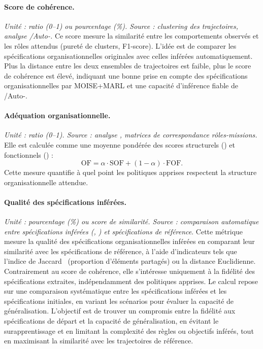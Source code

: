 \paragraph{Score de cohérence.}
\textit{Unité : ratio (0–1) ou pourcentage (\%). Source : clustering des trajectoires, analyse /Auto-.}
Ce score mesure la similarité entre les comportements observés et les rôles attendus (pureté de clusters, F1-score).
L'idée est de comparer les spécifications organisationnelles originales avec celles inférées automatiquement.
Plus la distance entre les deux ensembles de trajectoires est faible, plus le score de cohérence est élevé, indiquant une bonne prise en compte des spécifications organisationnelles par MOISE+MARL et une capacité d'inférence fiable de /Auto-.

\paragraph{Adéquation organisationnelle.}
\textit{Unité : ratio (0–1). Source : analyse , matrices de correspondance rôles-missions.}
Elle est calculée comme une moyenne pondérée des scores structurels () et fonctionnels () :
\[
  \text{OF} = \alpha \cdot \text{SOF} + (1-\alpha) \cdot \text{FOF}.
\]
Cette mesure quantifie à quel point les politiques apprises respectent la structure organisationnelle attendue.

\paragraph{Qualité des spécifications inférées.}
\textit{Unité : pourcentage (\%) ou score de similarité. Source : comparaison automatique entre spécifications inférées (, ) et spécifications de référence}.
Cette métrique mesure la qualité des spécifications organisationnelles inférées en comparant leur similarité avec les spécifications de référence, à l'aide d'indicateurs tels que l'indice de Jaccard~\cite{Jaccard1908} (proportion d'éléments partagés) ou la distance Euclidienne. Contrairement au score de cohérence, elle s'intéresse uniquement à la fidélité des spécifications extraites, indépendamment des politiques apprises. Le calcul repose sur une comparaison systématique entre les spécifications inférées et les spécifications initiales, en variant les scénarios pour évaluer la capacité de généralisation. L'objectif est de trouver un compromis entre la fidélité aux spécifications de départ et la capacité de généralisation, en évitant le surapprentissage et en limitant la complexité des règles ou objectifs inférés, tout en maximisant la similarité avec les trajectoires de référence.

